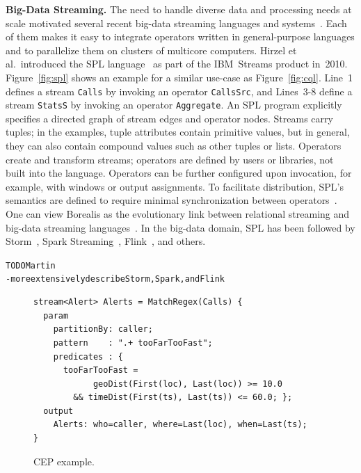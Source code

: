 \textbf{Big-Data Streaming.}
%
The need to handle diverse data and processing needs at scale
motivated several recent big-data streaming languages and
systems~\cite{carbone_et_al_2015,hirzel_schneider_gedik_2017,toshniwal_et_al_2014,zaharia_et_al_2013}.
Each of them makes it easy to integrate operators written in
general-purpose languages and to parallelize them on clusters of
multicore computers. Hirzel et al.\ introduced the SPL
language~\cite{hirzel_schneider_gedik_2017} as part of the IBM~Streams
product in~2010. Figure~\ref{fig:spl} shows an example for a similar
use-case as Figure~\ref{fig:cql}. Line~1 defines a stream
\lstinline{Calls} by invoking an operator \lstinline{CallsSrc}, and
\mbox{Lines 3-8} define a stream \lstinline{StatsS} by invoking an
operator \lstinline{Aggregate}. An SPL program explicitly specifies a
directed graph of stream edges and operator nodes. Streams carry
tuples; in the examples, tuple attributes contain primitive values,
but in general, they can also contain compound values such as other
tuples or lists.  Operators create and transform streams; operators
are defined by users or libraries, not built into the
language. Operators can be further configured upon invocation, for
example, with windows or output assignments. To facilitate
distribution, SPL's semantics are defined to require minimal
synchronization between operators~\cite{soule_et_al_2016}. One can
view Borealis as the evolutionary link between relational streaming
and big-data streaming languages~\cite{abadi_et_al_2005}. In the
big-data domain, SPL has been followed by
Storm~\cite{toshniwal_et_al_2014}, Spark
Streaming~\cite{zaharia_et_al_2013}, Flink~\cite{carbone_et_al_2015},
and others.

\begin{alltt}TODO\scriptsize Martin
- more extensively describe Storm, Spark, and Flink
\end{alltt}


\begin{figure}[!h]
\begin{lstlisting}
stream<Alert> Alerts = MatchRegex(Calls) {
  param
    partitionBy: caller;
    pattern    : ".+ tooFarTooFast";
    predicates : {
      tooFarTooFast =
            geoDist(First(loc), Last(loc)) >= 10.0
        && timeDist(First(ts), Last(ts)) <= 60.0; };
  output
    Alerts: who=caller, where=Last(loc), when=Last(ts);
}
\end{lstlisting}
\vspace*{-4mm}
\caption{\label{fig:cep}CEP example.}
\end{figure}

